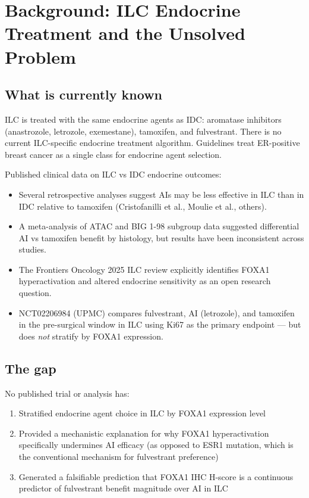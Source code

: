 \documentclass[12pt, a4paper]{article}
\begin{document}
\section{Background: ILC Endocrine Treatment
and the Unsolved Problem}

\subsection{What is currently known}

ILC is treated with the same endocrine agents as
IDC: aromatase inhibitors (anastrozole, letrozole,
exemestane), tamoxifen, and fulvestrant. There is
no current ILC-specific endocrine treatment
algorithm. Guidelines treat ER-positive breast
cancer as a single class for endocrine agent
selection.

Published clinical data on ILC vs IDC endocrine
outcomes:

\begin{itemize}
    \item Several retrospective analyses suggest
    AIs may be less effective in ILC than in IDC
    relative to tamoxifen (Cristofanilli et al.,
    Moulie et al., others).
    \item A meta-analysis of ATAC and BIG 1-98
    subgroup data suggested differential AI vs
    tamoxifen benefit by histology, but results
    have been inconsistent across studies.
    \item The Frontiers Oncology 2025 ILC review
    explicitly identifies FOXA1 hyperactivation
    and altered endocrine sensitivity as an open
    research question.
    \item NCT02206984 (UPMC) compares fulvestrant,
    AI (letrozole), and tamoxifen in the
    pre-surgical window in ILC using Ki67 as the
    primary endpoint --- but does \textit{not}
    stratify by FOXA1 expression.
\end{itemize}

\subsection{The gap}

No published trial or analysis has:
\begin{enumerate}
    \item Stratified endocrine agent choice in ILC
    by FOXA1 expression level
    \item Provided a mechanistic explanation for
    why FOXA1 hyperactivation specifically undermines
    AI efficacy (as opposed to ESR1 mutation, which
    is the conventional mechanism for fulvestrant
    preference)
    \item Generated a falsifiable prediction that
    FOXA1 IHC H-score is a continuous predictor of
    fulvestrant benefit magnitude over AI in ILC
\end{enumerate}
\end{document}
